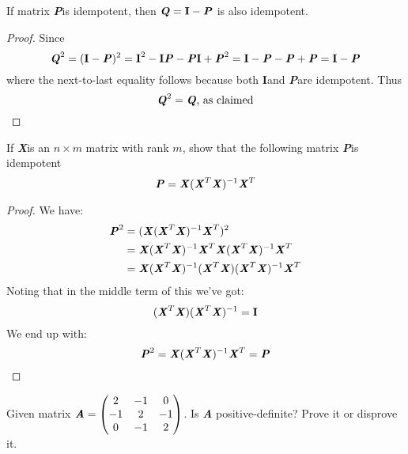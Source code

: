 \documentclass[12pt]{article}
\newcommand{\blditA}{\textbf{\textit{A}}}
\newcommand{\blditP}{\textbf{\textit{P}}}
\newcommand{\blditQ}{\textbf{\textit{Q}}}
\newcommand{\bldI}{\textbf{I}}
\newcommand{\blditX}{\textbf{\textit{X}}}
\newenvironment{question}[2][Question]{\begin{trivlist}
\item[\hskip \labelsep {\bfseries #1}\hskip \labelsep {\bfseries #2.}]}{\end{trivlist}}
\begin{document}
\bigskip
\bigskip

\begin{question}{1. 3. a} 
If matrix \blditP is idempotent, then $\blditQ = \bldI - \blditP$ is also idempotent.
\end{question}

\begin{proof}
Since
\begin{equation*}
\blditQ^2 = (\bldI - \blditP)^2 = \bldI^2 - \bldI \blditP - \blditP \bldI + \blditP^2 = \bldI - \blditP - \blditP + \blditP = \bldI - \blditP 
\end{equation*}
where the next-to-last equality follows because both \bldI and \blditP are idempotent. Thus
\begin{equation*}
\blditQ^2 = \blditQ \text{, as claimed}
\end{equation*}
\end{proof}



\bigskip
\begin{question}{1. 3. b} 
If \blditX is an $n \times m$ matrix with rank $m$, show that the following matrix \blditP is idempotent
\begin{equation*}
\blditP = \blditX (\blditX^T \blditX)^{-1}\blditX^T
\end{equation*}

\end{question}

\begin{proof}
We have:
\begin{align*}
\blditP^2 &= (\blditX (\blditX^T \blditX)^{-1}\blditX^T)^2 \\
 & = \blditX (\blditX^T \blditX)^{-1}\blditX^T \blditX (\blditX^T \blditX)^{-1}\blditX^T \\
 & = \blditX (\blditX^T \blditX)^{-1}(\blditX^T \blditX) (\blditX^T \blditX)^{-1}\blditX^T 
\end{align*}
Noting that in the middle term of this we've got:
\begin{equation*}
(\blditX^T \blditX) (\blditX^T \blditX)^{-1} = \bldI
\end{equation*}
We end up with:
\begin{equation*}
\blditP^2 = \blditX (\blditX^T \blditX)^{-1}\blditX^T = \blditP
\end{equation*}
\end{proof}

\bigskip
\bigskip
\begin{question}{1. 4} 
Given matrix $\blditA =  \begin{pmatrix}
  2 & -1 & 0\\
  -1 & 2 & -1\\
  0 & -1 & 2
\end{pmatrix} $. Is \blditA $ $ positive-definite? Prove it or disprove it.
\end{question}
\end{document}
